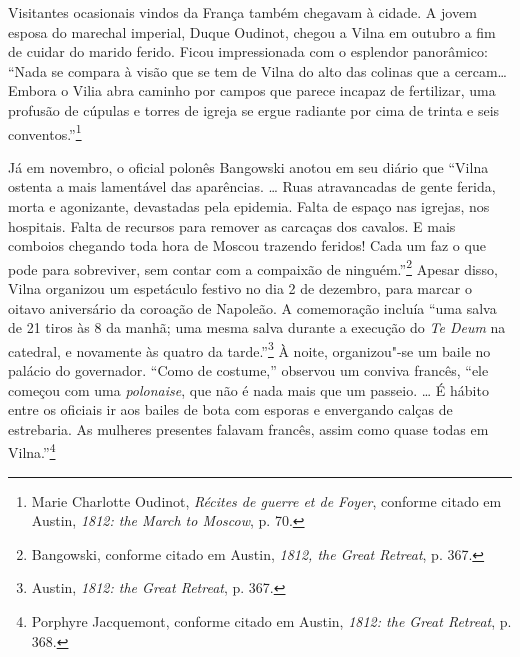 Visitantes ocasionais vindos da França também chegavam à cidade. A jovem
esposa do marechal imperial, Duque Oudinot, chegou a Vilna em outubro a
fim de cuidar do marido ferido. Ficou impressionada com o esplendor
panorâmico: ``Nada se compara à visão que se tem de Vilna do alto das
colinas que a cercam\ldots{} Embora o Vilia abra caminho por campos que
parece incapaz de fertilizar, uma profusão de cúpulas e torres de igreja
se ergue radiante por cima de trinta e seis conventos.''\footnote{Marie Charlotte Oudinot, \textit{Récites de guerre et de Foyer}, conforme citado em Austin, \textit{1812: the March to Moscow}, p. 70.}

Já em novembro, o oficial polonês Bangowski anotou em seu diário que
``Vilna ostenta a mais lamentável das aparências. \ldots{} Ruas
atravancadas de gente ferida, morta e agonizante, devastadas pela
epidemia. Falta de espaço nas igrejas, nos hospitais. Falta de recursos
para remover as carcaças dos cavalos. E mais comboios chegando toda hora
de Moscou trazendo feridos! Cada um faz o que pode para sobreviver, sem
contar com a compaixão de ninguém.''\footnote{Bangowski, conforme citado em Austin, \textit{1812, the Great Retreat}, p. 367.} Apesar disso, Vilna organizou um espetáculo festivo no dia 2 de dezembro, para marcar
o oitavo aniversário da coroação de Napoleão. A comemoração incluía
``uma salva de 21 tiros às 8 da manhã; uma mesma salva durante a
execução do \textit{Te Deum} na catedral, e novamente às quatro da
tarde.''\footnote{Austin, \textit{1812: the Great Retreat}, p. 367.} À
noite, organizou"-se um baile no palácio do governador. ``Como de
costume,'' observou um conviva francês, ``ele começou com uma \textit{polonaise},
que não é nada mais que um passeio. \ldots{} É hábito entre os oficiais
ir aos bailes de bota com esporas e envergando calças de estrebaria. As
mulheres presentes falavam francês, assim como quase todas em
Vilna.''\footnote{Porphyre Jacquemont, conforme citado em Austin, \textit{1812: the Great Retreat}, p. 368.}

